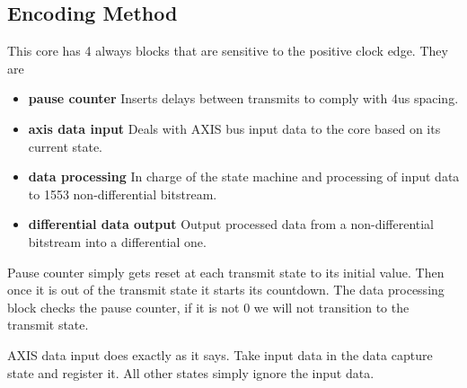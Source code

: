 \subsection{Encoding Method}
\par
This core has 4 always blocks that are sensitive to the positive clock edge. They are

\begin{itemize}
\item \textbf{pause counter} Inserts delays between transmits to comply with 4us spacing.
\item \textbf{axis data input} Deals with AXIS bus input data to the core based on its current state.
\item \textbf{data processing} In charge of the state machine and processing of input data to 1553 non-differential bitstream.
\item \textbf{differential data output} Output processed data from a non-differential bitstream into a differential one.
\end{itemize}

\par
Pause counter simply gets reset at each transmit state to its initial value. Then once it is out of the transmit state it starts its countdown.
The data processing block checks the pause counter, if it is not 0 we will not transition to the transmit state.

\par
AXIS data input does exactly as it says. Take input data in the data capture state and register it. All other states simply ignore the input data.

